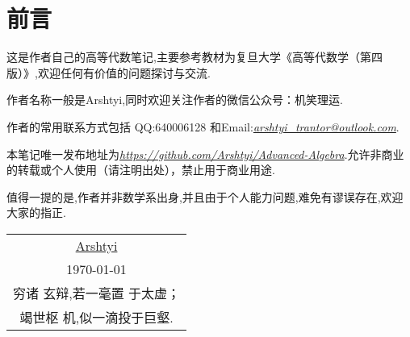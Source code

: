 \newpage
\section*{前言}
\thispagestyle{empty}
这是作者自己的高等代数笔记,主要参考教材为复旦大学《高等代数学（第四版）》,欢迎任何有价值的问题探讨与交流.

作者名称一般是Arshtyi,同时欢迎关注作者的微信公众号：机笑理运.

作者的常用联系方式包括 QQ:640006128 和Email:\textit{\url{arshtyi_trantor@outlook.com}}.

本笔记唯一发布地址为\textit{\url{https://github.com/Arshtyi/Advanced-Algebra}}.允许非商业的转载或个人使用（请注明出处），禁止用于商业用途.

值得一提的是,作者并非数学系出身,并且由于个人能力问题,难免有谬误存在,欢迎大家的指正.
\begin{flushright}
    \begin{tabular}{c}
        \href{https://github.com/Arshtyi}{Arshtyi} \\
        \today                                     \\ 穷诸
        玄辩,若一毫置
        于太虚；                                       \\ 竭世枢
        机,似一滴投于巨壑.
    \end{tabular}
\end{flushright}
\thispagestyle{empty}
